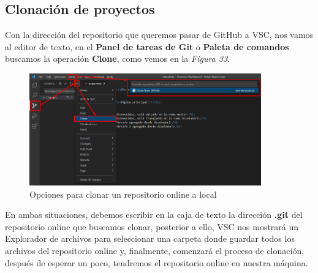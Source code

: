 \subsection{Clonación de proyectos}
Con la dirección del repositorio que queremos pasar de GitHub a VSC, nos vamos al editor de texto, en el \textbf{Panel de tareas de Git} o \textbf{Paleta de comandos} buscamos la operación \textbf{Clone}, como vemos en la \textit{Figura 33}.
\begin{figure}[H]
    \begin{center}
        \caption{Opciones para clonar un repositorio online a local}
        \label{fig: 33}
        \includegraphics[width=10cm]{capturas/clone.png}
    \end{center}
\end{figure}

En ambas situaciones, debemos escribir en la caja de texto la dirección \textbf{.git} del repositorio online que buscamos clonar, posterior a ello, VSC nos mostrará un Explorador de archivos para seleccionar una carpeta donde guardar todos los archivos del repositorio online y, finalmente, comenzará el proceso de clonación, después de esperar un poco, tendremos el repositorio online en nuestra máquina.





